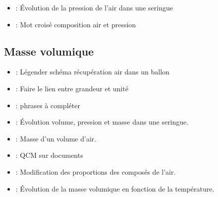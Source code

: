 \documentclass[12pt,a4paper]{article}
\begin{document}


\begin{myex}
	\begin{itemize}
		\item {} : \'Evolution de la pression de l'air dans une seringue
		\item {} : Mot croisé composition air et pression
	\end{itemize}
\end{myex}
\subsection{Masse volumique}



\begin{myex}
		\begin{itemize}
			\item {} : Légender schéma récupération air dans un  ballon
			\item {} : Faire le lien entre grandeur et unité
			
			\item {} : phrases à compléter
			\item {} : \'Evolution volume, pression et masse  dans une seringue.
			
			\item {} : Masse d'un volume d'air.
			
			\item {} : QCM sur documents
			
			\item {} : Modification des proportions des composés de l'air.
			
			\item {} : \'Evolution de la masse volumique en fonction de la température.
			
		\end{itemize}
\end{myex}

\appendix



%
\end{document}
